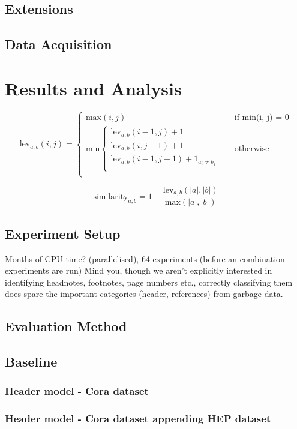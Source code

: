 \documentclass[10pt, oneside]{scrartcl}   	%
\begin{document}
\subsection{Extensions}
\subsection{Data Acquisition}
\section{Results and Analysis}
\[
  \text{lev}_{a, b}(i, j) = 
  \begin{cases} 
  	\text{max}(i, j) &\quad\text{if min(i, j) = 0} \\
	\text{min}
		\begin{cases}
			\text{lev}_{a, b}(i - 1, j) + 1 \\
			\text{lev}_{a, b}(i, j - 1) + 1 \\
			\text{lev}_{a, b}(i - 1, j - 1) + 1_{a_i \neq b_j} \\
		\end{cases} &\quad\text{otherwise} \\
  \end{cases}
\]

$$\text{similarity}_{a, b} =1 - \frac{\text{lev}_{a, b}(|a|, |b|)}{\text{max}(|a|, |b|)}$$

\subsection{Experiment Setup}
Months of CPU time? (parallelised), 64 experiments (before an combination experiments are run)
Mind you, though we aren't explicitly interested in identifying headnotes, footnotes, page numbers etc., correctly classifying them does spare the important categories (header, references) from garbage data.
\subsection{Evaluation Method}
\subsection{Baseline}
\subsubsection{Header model - Cora dataset}
\subsubsection{Header model - Cora dataset appending HEP dataset}
\end{document}
